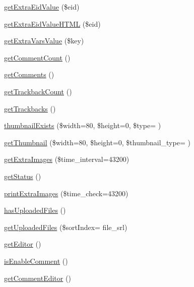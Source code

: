 \begin{DoxyCompactItemize}
\item 
\hyperlink{classdocumentItem_a9c2574375684cd06a16532744e279c65}{get\+Extra\+Eid\+Value} (\$eid)
\item 
\hyperlink{classdocumentItem_a52091af79c2df80f8f3c75e37adc2000}{get\+Extra\+Eid\+Value\+H\+T\+M\+L} (\$eid)
\item 
\hyperlink{classdocumentItem_ab555cb21a9a50d683836b8d4604d47f5}{get\+Extra\+Vars\+Value} (\$key)
\item 
\hyperlink{classdocumentItem_a9ed429fc56e6f95ef097645c772aa4e5}{get\+Comment\+Count} ()
\item 
\hyperlink{classdocumentItem_ad85b3da641f8bd477963d7290383e6be}{get\+Comments} ()
\item 
\hyperlink{classdocumentItem_af1520e91e8dd49202cfb93909db61c48}{get\+Trackback\+Count} ()
\item 
\hyperlink{classdocumentItem_a0c69601e59c290048081bf8d8aa7602e}{get\+Trackbacks} ()
\item 
\hyperlink{classdocumentItem_a3a8615b0ed43420047a75fb6cb719d86}{thumbnail\+Exists} (\$width=80, \$height=0, \$type= \textquotesingle{}\textquotesingle{})
\item 
\hyperlink{classdocumentItem_a033dd804282c738052af3347e9816ef4}{get\+Thumbnail} (\$width=80, \$height=0, \$thumbnail\+\_\+type= \textquotesingle{}\textquotesingle{})
\item 
\hyperlink{classdocumentItem_a0f72df4345359453aa01ff1490071c5a}{get\+Extra\+Images} (\$time\+\_\+interval=43200)
\item 
\hyperlink{classdocumentItem_aa750ee0716698bf29c9690382b7fa3ef}{get\+Status} ()
\item 
\hyperlink{classdocumentItem_a9d185a16e4439823e7e4871c2fb0659a}{print\+Extra\+Images} (\$time\+\_\+check=43200)
\item 
\hyperlink{classdocumentItem_af031d09271c9099d26b6619f9c436f68}{has\+Uploaded\+Files} ()
\item 
\hyperlink{classdocumentItem_a47ef433ba4e5147842df6c83f341d5d4}{get\+Uploaded\+Files} (\$sort\+Index= \textquotesingle{}file\+\_\+srl\textquotesingle{})
\item 
\hyperlink{classdocumentItem_a26477197e85301bc88e35157fdcb7482}{get\+Editor} ()
\item 
\hyperlink{classdocumentItem_aff71a0f39ddc720c21c5cf39805b31a8}{is\+Enable\+Comment} ()
\item 
\hyperlink{classdocumentItem_a59ef94b52cf1a250aa4f29990e8d376d}{get\+Comment\+Editor} ()
\item 

\end{DoxyCompactItemize}
